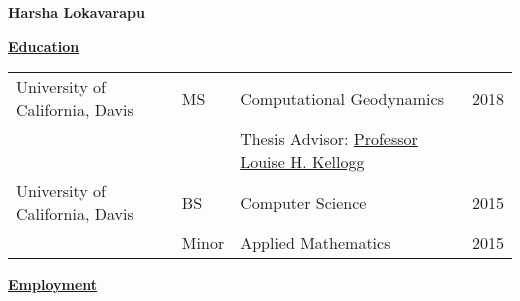 \documentclass[11pt]{ltxdoc}
\begin{document}
\begin{center}
  \textbf{Harsha Lokavarapu}
\end{center}
\vskip -10pt

\textbf{\underline{Education}}

\vskip -06pt

\begin{tabular}{llll}
University of California, Davis              &MS       &Computational Geodynamics      & 2018 \\
                                             &       &Thesis Advisor: \href{http://geology.ucdavis.edu/people/faculty/kellogg.php}{Professor Louise H. Kellogg}        &  \\
University of California, Davis              &BS      & Computer Science                         & 2015       \\
                                             &Minor   & Applied Mathematics                      & 2015
\end{tabular}


\vskip -10pt
\textbf{\underline{Employment}}
\end{document}
